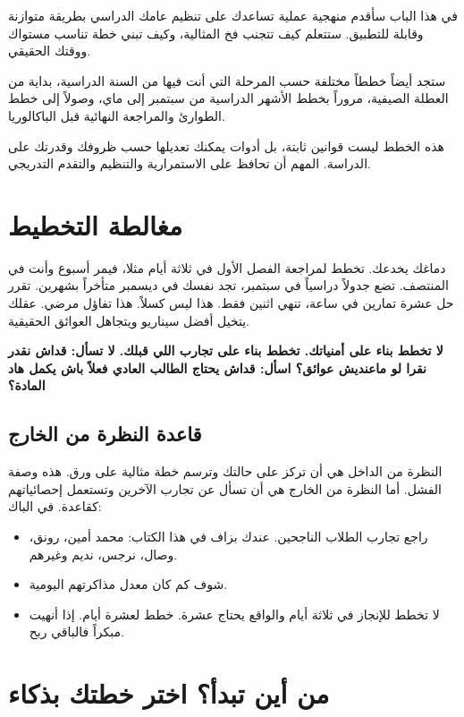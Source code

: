 \documentclass[12pt,a4paper]{book}
\newcommand{\importantAr}[1]{%
	\begin{important}
		\bfseries #1
	\end{important}
}
\begin{document}
	في هذا الباب سأقدم منهجية عملية تساعدك على تنظيم عامك الدراسي بطريقة متوازنة وقابلة للتطبيق. ستتعلم كيف تتجنب فخ المثالية، وكيف تبني خطة تناسب مستواك ووقتك الحقيقي.
	
	ستجد أيضاً خططاً مختلفة حسب المرحلة التي أنت فيها من السنة الدراسية، بداية من العطلة الصيفية، مروراً بخطط الأشهر الدراسية من سبتمبر إلى ماي، وصولاً إلى خطط الطوارئ والمراجعة النهائية قبل الباكالوريا.
	
	هذه الخطط ليست قوانين ثابتة، بل أدوات يمكنك تعديلها حسب ظروفك وقدرتك على الدراسة. المهم أن تحافظ على الاستمرارية والتنظيم والتقدم التدريجي.
	
\section{مغالطة التخطيط}
\label{sec:planning-fallacy}

دماغك يخدعك. تخطط لمراجعة الفصل الأول في ثلاثة أيام مثلا، فيمر أسبوع وأنت في المنتصف. تضع جدولاً دراسياً في سبتمبر، تجد نفسك في ديسمبر متأخراً بشهرين. تقرر حل عشرة تمارين في ساعة، تنهي اثنين فقط. هذا ليس كسلاً. هذا تفاؤل مرضي. عقلك يتخيل أفضل سيناريو ويتجاهل العوائق الحقيقية.

\importantAr{لا تخطط بناء على أمنياتك. تخطط بناء على تجارب اللي قبلك. لا تسأل: قداش نقدر نقرا لو ماعنديش عوائق؟ اسأل: قداش يحتاج الطالب العادي فعلاً باش يكمل هاد المادة؟}

\subsection*{قاعدة النظرة من الخارج}

    النظرة من الداخل هي أن تركز على حالتك وترسم خطة مثالية على ورق. هذه وصفة الفشل. أما النظرة من الخارج هي أن تسأل عن تجارب الآخرين وتستعمل إحصائياتهم كقاعدة. في الباك:
\begin{itemize}
	\item راجع تجارب الطلاب الناجحين. عندك بزاف في هذا الكتاب: محمد أمين، رونق، وصال، نرجس، نديم وغيرهم.
	\item شوف كم كان معدل مذاكرتهم اليومية.
	\item لا تخطط للإنجاز في ثلاثة أيام والواقع يحتاج عشرة. خطط لعشرة أيام. إذا أنهيت مبكراً فالباقي ربح.
\end{itemize}

	\section{من أين تبدأ؟ اختر خطتك بذكاء}
	\label{sec:owner-experiences6}
	
\end{document}
